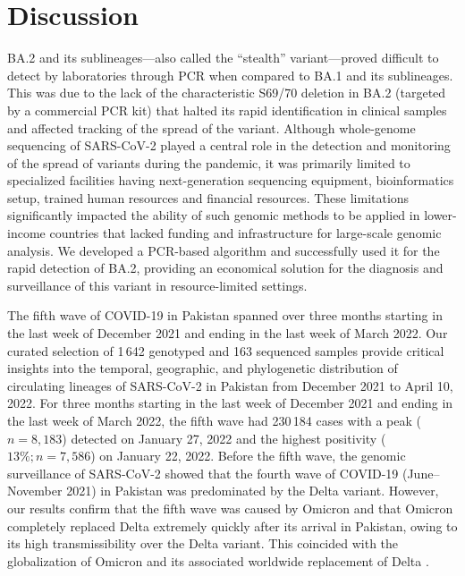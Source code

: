 \section{Discussion}\label{sec-disc}
BA.2 and its sublineages---also called the ``stealth'' variant---proved difficult to detect by laboratories through PCR when compared to BA.1 and its sublineages.
This was due to the lack of the characteristic S69/70 deletion in BA.2 (targeted by a commercial PCR kit) that halted its rapid identification in clinical samples and affected tracking of the spread of the variant.
Although whole-genome sequencing of SARS-CoV-2 played a central role in the detection and monitoring of the spread of variants during the pandemic, it was primarily limited to specialized facilities having next-generation sequencing equipment, bioinformatics setup, trained human resources and financial resources. These limitations significantly impacted the ability of such genomic methods to be applied in lower-income countries that lacked funding and infrastructure for large-scale genomic analysis.
We developed a PCR-based algorithm and successfully used it for the rapid detection of BA.2, providing an economical solution for the diagnosis and surveillance of this variant in resource-limited settings.

The fifth wave of COVID-19 in Pakistan spanned over three months starting in the last week of December 2021 and ending in the last week of March 2022.
Our curated selection of 1\,642 genotyped and 163 sequenced samples provide critical insights into the temporal, geographic, and phylogenetic distribution of circulating lineages of SARS-CoV-2 in Pakistan from December 2021 to April 10, 2022.
For three months starting in the last week of December 2021 and ending in the last week of March 2022, the fifth wave had 230\,184 cases with a peak ($n=8,183$) detected on January 27, 2022 and the highest positivity ($13\%; n=7,586$) on January 22, 2022.
Before the fifth wave, the genomic surveillance of SARS-CoV-2 showed that the fourth wave of COVID-19 (June--November 2021) in Pakistan was predominated by the Delta variant. However, our results confirm that the fifth wave was caused by Omicron and that Omicron completely replaced Delta extremely quickly after its arrival in Pakistan, owing to its high transmissibility over the Delta variant.
This coincided with the globalization of Omicron and its associated worldwide replacement of Delta \cite{mohapatra2022twin, mohapatra2022Omicron}.


